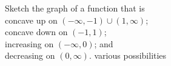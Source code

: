 {Sketch the graph of a function that is\\
concave up on $(-\infty,-1)\cup(1,\infty)$;\\
concave down on $(-1,1)$;\\
increasing on $(-\infty,0)$; and\\
decreasing on $(0,\infty)$.}
{various possibilities}
